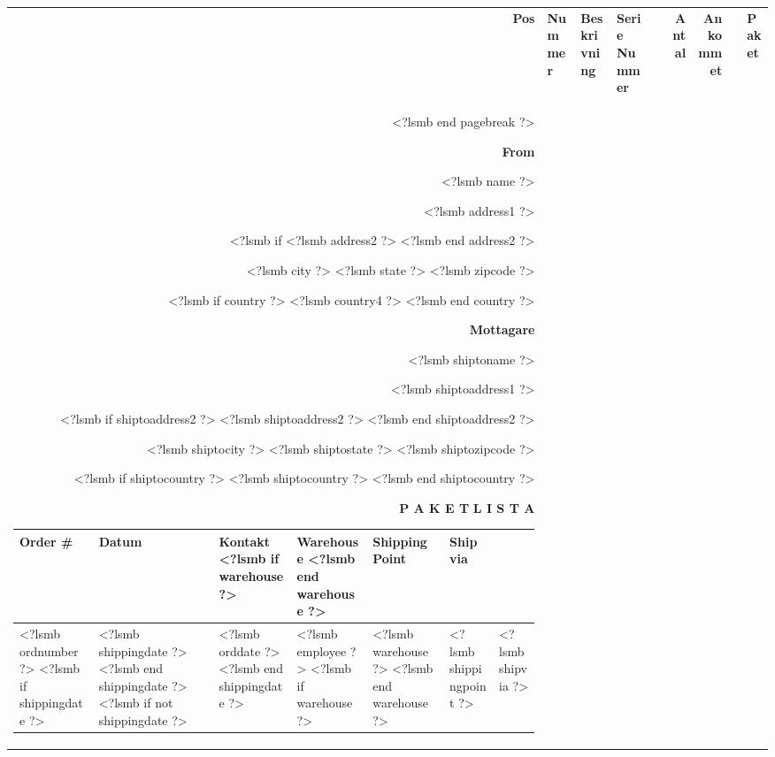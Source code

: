 \documentclass[twoside]{scrartcl}
\begin{document}
\begin{tabularx}{\textwidth}{@{}rlXllrrll@{}}
  \textbf{Pos} & \textbf{Nummer} & \textbf{Beskrivning} & \textbf{Serie Nummer} & & \textbf{Antal} & \textbf{Ankommet} & & \textbf{Paket} \\
<?lsmb end pagebreak ?>


\vspace*{0.5cm}

\parbox[t]{1cm}{\hfill}
\parbox[t]{.5\textwidth}{
\textbf{From}
\vspace{0.7cm}

<?lsmb name ?>

<?lsmb address1 ?>

<?lsmb if %
<?lsmb address2 ?>
<?lsmb end address2 ?>

<?lsmb city ?> <?lsmb state ?> <?lsmb zipcode ?>

<?lsmb if country ?>
<?lsmb country4 ?>
<?lsmb end country ?>
}
\parbox[t]{.4\textwidth}{
\textbf{Mottagare}
\vspace{0.7cm}

<?lsmb shiptoname ?>

<?lsmb shiptoaddress1 ?>

<?lsmb if shiptoaddress2 ?>
<?lsmb shiptoaddress2 ?>
<?lsmb end shiptoaddress2 ?>

<?lsmb shiptocity ?> <?lsmb shiptostate ?> <?lsmb shiptozipcode ?>

<?lsmb if shiptocountry ?>
<?lsmb shiptocountry ?>
<?lsmb end shiptocountry ?>
}
\hfill

\vspace{1cm}

\textbf{P A K E T} \parbox{0.3cm}{\hfill} \textbf{L I S T A}
\hfill

\vspace{1cm}

\begin{tabularx}{\textwidth}{*{6}{|X}|} \hline
  \textbf{Order \#} & \textbf{Datum} & \textbf{Kontakt}
  <?lsmb if warehouse ?>
  & \textbf{Warehouse}
  <?lsmb end warehouse ?>
  & \textbf{Shipping Point} & \textbf{Ship via} \\ [0.5em]
  \hline
  
  <?lsmb ordnumber ?>
  <?lsmb if shippingdate ?>
  & <?lsmb shippingdate ?>
  <?lsmb end shippingdate ?>
  <?lsmb if not shippingdate ?>
  & <?lsmb orddate ?>
  <?lsmb end shippingdate ?>
  & <?lsmb employee ?>
  <?lsmb if warehouse ?>
  & <?lsmb warehouse ?>
  <?lsmb end warehouse ?>
  & <?lsmb shippingpoint ?> & <?lsmb shipvia ?> \\
  \hline
\end{tabularx}
  

\end{tabularx}
\end{document}
